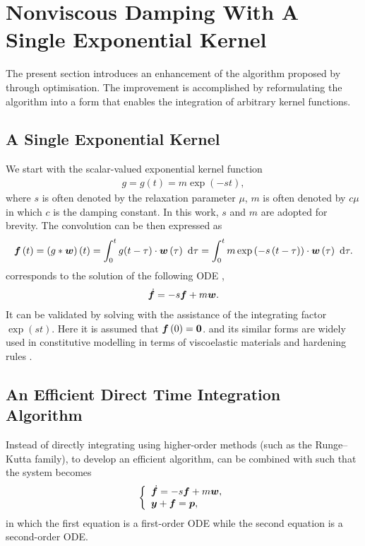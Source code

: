 \section{Nonviscous Damping With A Single Exponential Kernel}\label{sec:single}
The present section introduces an enhancement of the algorithm proposed by \citet{Adhikari2004} through optimisation. The improvement is accomplished by reformulating the algorithm into a form that enables the integration of arbitrary kernel functions.
\subsection{A Single Exponential Kernel}
We start with the scalar-valued exponential kernel function
\begin{gather}
g=g\left(t\right)=m\exp\left(-st\right),
\end{gather}
where $s$ is often denoted by the relaxation parameter $\mu$, $m$ is often denoted by $c\mu$ in which $c$ is the damping constant. In this work, $s$ and $m$ are adopted for brevity.
The convolution can be then expressed as
\begin{gather}\label{eq:single_conv}
\bm{f}\left(t\right)=\left(g*\bm{w}\right)\left(t\right)=\int_0^tg(t-\tau)\cdot\bm{w}\left(\tau\right)~\mathrm{d}\tau=\int_0^tm\exp\left(-s\left(t-\tau\right)\right)\cdot\bm{w}\left(\tau\right)~\mathrm{d}\tau.
\end{gather}
 corresponds to the solution of the following ODE \citep[see, e.g.,][\S~80]{Zwillinger2021},
\begin{gather}\label{eq:single_conv_ode}
\dot{\bm{f}}=-s\bm{f}+m\bm{w}.
\end{gather}
It can be validated by solving  with the assistance of the integrating factor $\exp\left(st\right)$. Here it is assumed that $\bm{f}\left(0\right)=\bm{0}$.  and its similar forms are widely used in constitutive modelling in terms of viscoelastic materials \citep[e.g.,][]{Muravyov1998} and hardening rules \citep[e.g.,][]{Chaboche1989}.
\subsection{An Efficient Direct Time Integration Algorithm}
Instead of directly integrating  using higher-order methods (such as the Runge--Kutta family), to develop an efficient algorithm,  can be combined with  such that the system becomes
\begin{gather}\label{eq:eqv_sys}
\left\{
\begin{array}{l}
\dot{\bm{f}}=-s\bm{f}+m\bm{w},\\
\bm{y}+\bm{f}=\bm{p},
\end{array}\right.
\end{gather}
in which the first equation is a first-order ODE while the second equation is a second-order ODE.

